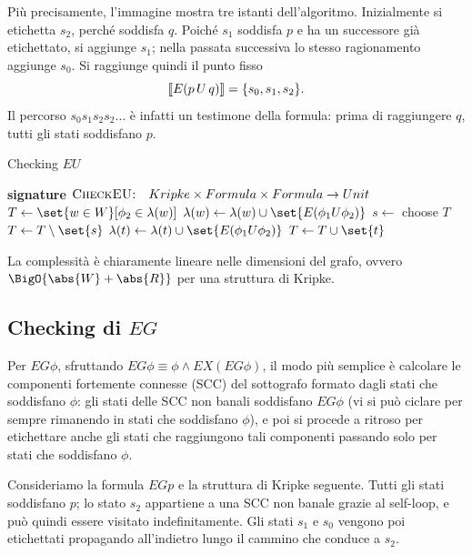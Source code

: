 Più precisamente, l'immagine mostra tre istanti dell'algoritmo. Inizialmente si etichetta \(s_2\), perché soddisfa \(q\). Poiché \(s_1\) soddisfa \(p\) e ha un successore già etichettato, si aggiunge \(s_1\); nella passata successiva lo stesso ragionamento aggiunge \(s_0\). Si raggiunge quindi il punto fisso
\[
  \den{E(p\,U\,q)}=\{s_0,s_1,s_2\}.
\]
Il percorso \(s_0s_1s_2s_2\ldots\) è infatti un testimone della formula: prima di raggiungere \(q\), tutti gli stati soddisfano \(p\).

\begin{algorithmdesc}{Checking \(EU\)}
  \begin{algorithmic}[1]
    \Statex{} \textbf{signature} \(\textsc{CheckEU:} \quad Kripke \times Formula \times Formula \to Unit\)
    \State{} \(T \gets \set{w \in W}[ \phi_2 \in \lambda(w)]\)
    \State{} \(\lambda(w) \gets \lambda(w)\cup\set{E (\phi_1 U \phi_2)}\)
    \EndFor{}
    \State{} \(s \gets\) choose \(T\)
    \State{} \(T \gets T\setminus\set{s}\)
    \State{} \(\lambda(t) \gets \lambda(t)\cup\set{E (\phi_1 U \phi_2)}\)
    \State{} \(T \gets T\cup\set{t}\)
    \EndIf{}
    \EndFor{}
    \EndWhile{}
    \EndFunction{}
  \end{algorithmic}
\end{algorithmdesc}

La complessità è chiaramente lineare nelle dimensioni del grafo, ovvero \(\BigO{\abs{W} + \abs{R}}\) per una struttura di Kripke.

\subsection{Checking di \texorpdfstring{\(EG\)}{EG}}

Per \(EG\phi\), sfruttando \(EG \phi \equiv \phi \land EX (EG \phi)\), il modo più semplice è calcolare le componenti fortemente connesse (SCC) del sottografo formato dagli stati che soddisfano \(\phi\): gli stati delle SCC non banali soddisfano \(EG \phi\) (vi si può ciclare per sempre rimanendo in stati che soddisfano \(\phi\)), e poi si procede a ritroso per etichettare anche gli stati che raggiungono tali componenti passando solo per stati che soddisfano \(\phi\).

Consideriamo la formula \(EGp\) e la struttura di Kripke seguente. Tutti gli stati soddisfano \(p\); lo stato \(s_2\) appartiene a una SCC non banale grazie al self-loop, e può quindi essere visitato indefinitamente. Gli stati \(s_1\) e \(s_0\) vengono poi etichettati propagando all'indietro lungo il cammino che conduce a \(s_2\).

